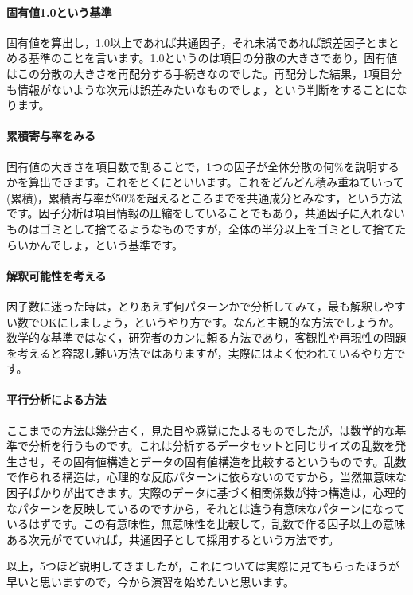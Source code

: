 \documentclass{ltjsbook}
\begin{document}
\paragraph{固有値1.0という基準}固有値を算出し，1.0以上であれば共通因子，それ未満であれば誤差因子とまとめる基準のことを言います。1.0というのは項目の分散の大きさであり，固有値はこの分散の大きさを再配分する手続きなのでした。再配分した結果，1項目分も情報がないような次元は誤差みたいなものでしょ，という判断をすることになります。
\paragraph{累積寄与率をみる}固有値の大きさを項目数で割ることで，1つの因子が全体分散の何\%を説明するかを算出できます。これをとくにといいます。これをどんどん積み重ねていって(累積)，累積寄与率が50\%を超えるところまでを共通成分とみなす，という方法です。因子分析は項目情報の圧縮をしていることでもあり，共通因子に入れないものはゴミとして捨てるようなものですが，全体の半分以上をゴミとして捨てたらいかんでしょ，という基準です。
\paragraph{解釈可能性を考える}因子数に迷った時は，とりあえず何パターンかで分析してみて，最も解釈しやすい数でOKにしましょう，というやり方です。なんと主観的な方法でしょうか。数学的な基準ではなく，研究者のカンに頼る方法であり，客観性や再現性の問題を考えると容認し難い方法ではありますが，実際にはよく使われているやり方です。
\paragraph{平行分析による方法}ここまでの方法は幾分古く，見た目や感覚にたよるものでしたが，は数学的な基準で分析を行うものです。これは分析するデータセットと同じサイズの乱数を発生させ，その固有値構造とデータの固有値構造を比較するというものです。乱数で作られる構造は，心理的な反応パターンに依らないのですから，当然無意味な因子ばかりが出てきます。実際のデータに基づく相関係数が持つ構造は，心理的なパターンを反映しているのですから，それとは違う有意味なパターンになっているはずです。この有意味性，無意味性を比較して，乱数で作る因子以上の意味ある次元がでていれば，共通因子として採用するという方法です。

以上，5つほど説明してきましたが，これについては実際に見てもらったほうが早いと思いますので，今から演習を始めたいと思います。
\end{document}
